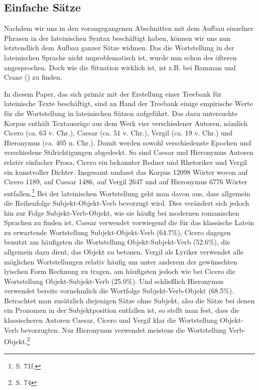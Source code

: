 \subsection{Einfache Sätze}
\label{subsec:einfachesaetze}
Nachdem wir uns in den vorangegangenen Abschnitten mit dem Aufbau einzelner Phrasen in der lateinischen Syntax beschäftigt haben, können wir uns nun letztendlich dem Aufbau ganzer Sätze widmen. Das die Wortstellung in der lateinischen Sprache nicht unproblematisch ist, wurde nun schon des öfteren angesprochen. Doch wie die Situation wirklich ist, ist z.B. bei Bamman und Crane (\cite{BAMMAN2006}) zu finden. \par 
In diesem Paper, das sich primär mit der Erstellung einer Treebank für lateinische Texte beschäftigt, sind an Hand der Treebank einige empirische Werte für die Wortstellung in lateinischen Sätzen aufgeführt. Das dazu untersuchte Korpus enthält Textauszüge aus dem Werk vier verschiedener Autoren, nämlich Cicero (ca. 63 v. Chr.), Caesar (ca. 51 v. Chr.), Vergil (ca. 19 v. Chr.) und Hieronymus (ca. 405 n. Chr.). Damit werden sowohl verschiedenste Epochen und verschiedene Stilrichtigungen abgedeckt. So sind Caesar und Hieronymus Autoren relativ einfacher Prosa, Cicero ein bekannter Redner und Rhetoriker und Vergil ein kunstvoller Dichter. Insgesamt umfasst das Korpus 12098 Wörter wovon auf Cicero 1189, auf Caesar 1486, auf Vergil 2647 und auf Hieronymus 6776 Wörter entfallen.\footnote{\cite{BAMMAN2006} S. 71f.} 
Bei der lateinischen Wortstellung geht man davon aus, dass allgemein die Reihenfolge Subjekt-Objekt-Verb bevorzugt wird. Dies verändert sich jedoch hin zur Folge Subjekt-Verb-Objekt, wie sie häufig bei modernen romanischen Sprachen zu finden ist. Caesar verwendet vorwiegend die für das klassische Latein zu erwartende Wortstellung Subjekt-Objekt-Verb (64.7\%), Cicero dagegen benutzt am häufigsten die Wortstellung Objekt-Subjekt-Verb (52.6\%), die allgemein dazu dient, das Objekt zu betonen. Vergil als Lyriker verwendet alle möglichen Wortstellungen relativ häufig um unter anderem der gewünschten lyischen Form Rechnung zu tragen, am häufigsten jedoch wie bei Cicero die Wortstellung Objekt-Subjekt-Verb (25.0\%). Und schließlich Hieronymus verwendet bereits vornehmlich die Wortfolge Subjekt-Verb-Objekt (68.5\%). Betrachtet man zusätzlich diejenigen Sätze ohne Subjekt, also die Sätze bei denen ein Pronomen in der Subjektposition entfallen ist, so stellt man fest, dass die klassischeren Autoren Caesar, Cicero und Vergil klar die Wortstellung  Objekt-Verb bevorzugten. Nur Hieronymus verwendet meistens die Wortstellung Verb-Objekt.\footnote{\cite{BAMMAN2006} S. 74} \par
